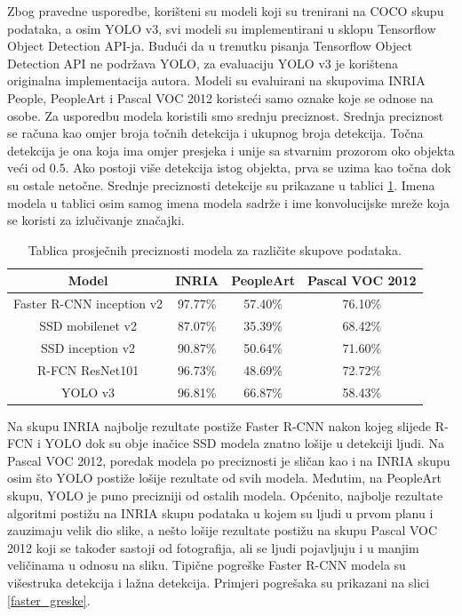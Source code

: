 Zbog pravedne usporedbe, korišteni su modeli koji su trenirani na COCO skupu podataka, a osim YOLO v3, svi modeli su implementirani u sklopu Tensorflow Object Detection API-ja. Budući da u trenutku pisanja Tensorflow Object Detection API ne podržava YOLO, za evaluaciju YOLO v3 je korištena originalna implementacija autora. Modeli su evaluirani na skupovima INRIA People, PeopleArt i Pascal VOC 2012 koristeći samo oznake koje se odnose na osobe. Za usporedbu modela koristili smo srednju preciznost. Srednja preciznost se računa kao omjer broja točnih detekcija i ukupnog broja detekcija. Točna detekcija je ona koja ima omjer presjeka i unije sa stvarnim prozorom oko objekta veći od $0.5$. Ako postoji više detekcija istog objekta, prva se uzima kao točna dok su ostale netočne. Srednje preciznosti detekcije su prikazane u tablici \ref{tablica_preciznosti}. Imena modela u tablici osim samog imena modela sadrže i ime konvolucijske mreže koja se koristi za izlučivanje značajki.

\begin{table}[h]
	\begin{center}
	\begin{tabular}{| c | c | c | c |}
		\hline
		Model & INRIA & PeopleArt & Pascal VOC 2012 \\ \hline
		Faster R-CNN inception v2 & 97.77\% & 57.40\% & 76.10\% \\ \hline
		SSD mobilenet v2 & 87.07\% & 35.39\% & 68.42\% \\ \hline
		SSD inception v2 & 90.87\% & 50.64\% & 71.60\% \\ \hline
		R-FCN ResNet101 & 96.73\% & 48.69\% & 72.72\% \\ \hline
		YOLO v3 & 96.81\% & 66.87\% & 58.43\%  \\ \hline 
	\end{tabular}

	\caption{Tablica prosječnih preciznosti modela za različite skupove podataka.}
	\label{tablica_preciznosti}
	\end{center}
\end{table}

Na skupu INRIA najbolje rezultate postiže Faster R-CNN nakon kojeg slijede R-FCN i YOLO dok su obje inačice SSD modela znatno lošije u detekciji ljudi. Na Pascal VOC 2012, poredak modela po preciznosti je sličan kao i na INRIA skupu osim što YOLO postiže lošije rezultate od svih modela. Međutim, na PeopleArt skupu, YOLO je puno precizniji od ostalih modela.
Općenito, najbolje rezultate algoritmi postižu na INRIA skupu podataka u kojem su ljudi u prvom planu i zauzimaju velik dio slike, a nešto lošije rezultate postižu na skupu Pascal VOC 2012 koji se također sastoji od fotografija, ali se ljudi pojavljuju i u manjim veličinama u odnosu na sliku.
Tipične pogreške Faster R-CNN modela su višestruka detekcija i lažna detekcija. Primjeri pogrešaka su prikazani na slici \ref{faster_greske}.

